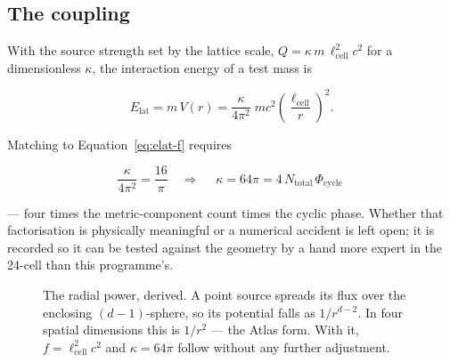 \documentclass[11pt, letterpaper, openany]{book}
\begin{document}
\subsection{The coupling}

With the source strength set by the lattice scale, $Q = \kappa\, m\, \ell_{\mathrm{cell}}^2 c^2$ for
a dimensionless $\kappa$, the interaction energy of a test mass is

\begin{equation}
E_{\mathrm{lat}} = m\, V(r) = \frac{\kappa}{4\pi^2}\; m c^2 \left(\frac{\ell_{\mathrm{cell}}}{r}\right)^2 .
\end{equation}

Matching to Equation~\ref{eq:elat-f} requires

\begin{equation}
\frac{\kappa}{4\pi^2} = \frac{16}{\pi}
\quad\Longrightarrow\quad
\boxed{\;\kappa = 64\pi = 4\,N_{\mathrm{total}}\,\Phi_{\mathrm{cycle}}\;}
\end{equation}

--- four times the metric-component count times the cyclic phase. Whether that factorisation is
physically meaningful or a numerical accident is left open; it is recorded so it can be tested
against the geometry by a hand more expert in the 24-cell than this programme's.

\begin{figure}[H]
\centering
{}
\caption{The radial power, derived. A point source spreads its flux over the enclosing
$(d{-}1)$-sphere, so its potential falls as $1/r^{d-2}$. In four spatial dimensions this is $1/r^2$
--- the Atlas form. With it, $f = \ell_{\mathrm{cell}}^2 c^2$ and $\kappa = 64\pi$ follow without any
further adjustment.}
\end{figure}
\end{document}
